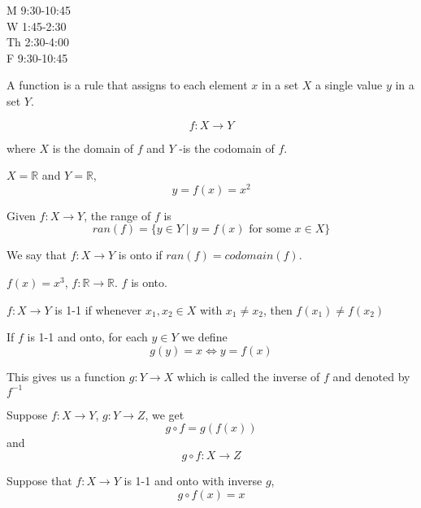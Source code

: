 
\vspace{0.2 in}

M 9:30-10:45\\
W 1:45-2:30\\
Th 2:30-4:00\\
F 9:30-10:45


\begin{defn}
A function is a rule that assigns to each element $x$ in a set $X$ a single value $y$ in a set $Y$.
\end{defn}

\begin{nota}
$$f\colon X\to Y$$

where $X$ is the domain of $f$ and $Y$ -is the codomain of $f$.
\end{nota}

\begin{exmp}
 $X=\mathbb{R}$ and $Y=\mathbb{R}$, $$y = f(x) = x^2$$
\end{exmp}


\begin{defn}
Given $f\colon X\to Y$, the range of $f$ is $$ran(f) = \{y\in Y\mid y = f(x) \text{ for some }x\in X \}$$
\end{defn}

We say that $f\colon X\to Y$ is onto if $ran(f)=codomain(f)$.

\begin{exmp}
$f(x)=x^3$, $f\colon \mathbb{R}\to \mathbb{R}$. $f$ is onto.
\end{exmp} 

$f\colon X\to Y$ is 1-1 if whenever $x_1,x_2\in X$ with $x_1\neq x_2$, then $f(x_1)\neq f(x_2)$

If $f$ is 1-1 and onto, for each $y\in Y$ we define $$g(y)=x \iff y = f(x)$$

This gives us a function $g\colon Y\to X$ which is called the inverse of $f$ and denoted by $f^{-1}$


Suppose $f\colon X\to Y$, $g\colon Y\to Z$, we get $$g\circ f = g(f(x))$$ and $$g\circ f \colon X\to Z$$

Suppose that $f\colon X\to Y$ is 1-1 and onto with inverse $g$, $$g\circ f(x)= x$$
